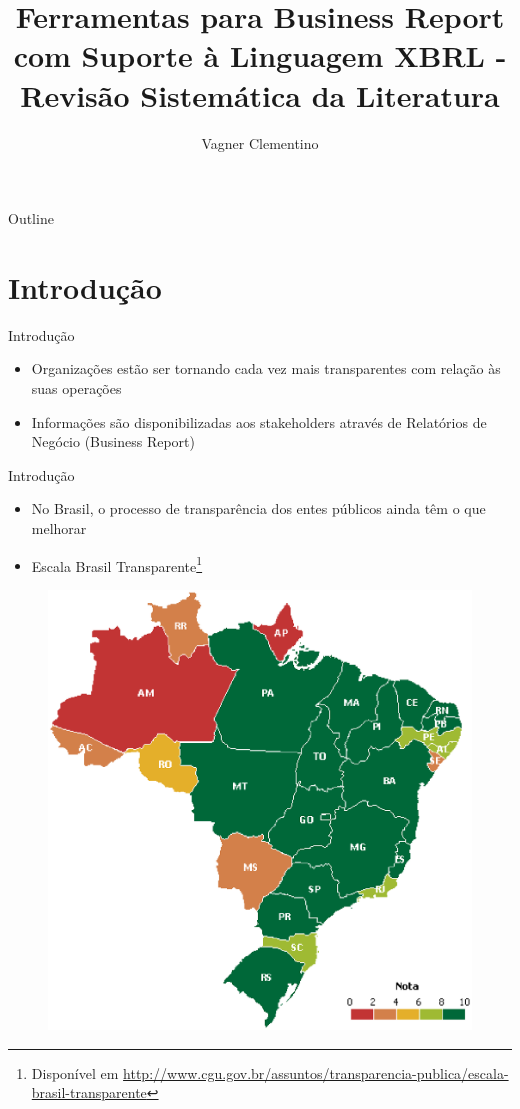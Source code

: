 \documentclass[t,14pt,mathserif]{beamer}
\title[] %
{Ferramentas para Business Report \\
com Suporte à Linguagem XBRL - \\
Revisão Sistemática da Literatura}
\subtitle
{Vagner Clementino}
\institute[] %
{
  Departamento de Ciência da Computação\\
  Universidade Federal de Minas Gerais (UFMG)\\
  Empirical Software Engineering - 2015\\
  }
\date[2015/12/16] %
\begin{document}
\begin{frame}
  \titlepage
\end{frame}

\begin{frame}{Outline}
  \tableofcontents
\end{frame}




\section{Introdução}
\begin{frame}{Introdução}
    \begin{itemize}
      \item Organizações estão ser tornando cada vez mais transparentes com
        relação às suas operações
      \item Informações são disponibilizadas aos stakeholders através de
        Relatórios de Negócio (Business Report)

    \end{itemize}
\end{frame}

\begin{frame}{Introdução}
    \begin{itemize}
      \item No Brasil, o processo de transparência dos entes públicos ainda têm
        o que melhorar
       \item Escala Brasil Transparente\footnote{Disponível em \url{http://www.cgu.gov.br/assuntos/transparencia-publica/escala-brasil-transparente}}
    \end{itemize}

\begin{figure}[htb]
\centering
\includegraphics[width=.357\textwidth]{../img/ebt.eps}
\end{figure}
\end{frame}
\end{document}
